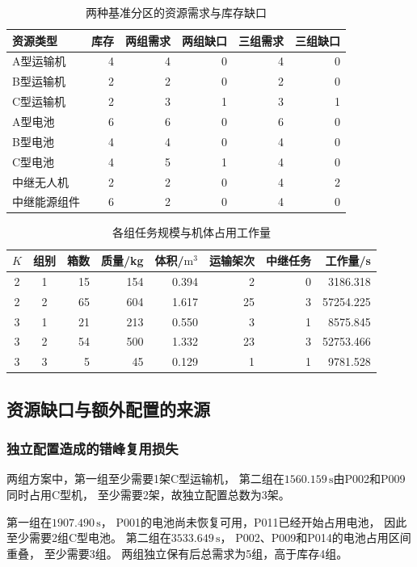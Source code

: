 \documentclass[bwprint]{gmcmthesis}
\begin{document}
\begin{table}[htbp]
\centering
\caption{两种基准分区的资源需求与库存缺口}
\label{tab:q4_resources}
\begin{tabular}{lrrrrr}
\toprule
资源类型 & 库存 & 两组需求 & 两组缺口 & 三组需求 & 三组缺口\\
\midrule
A型运输机 &4&4&0&4&0\\
B型运输机 &2&2&0&2&0\\
C型运输机 &2&3&1&3&1\\
A型电池   &6&6&0&6&0\\
B型电池   &4&4&0&4&0\\
C型电池   &4&5&1&4&0\\
中继无人机 &2&2&0&4&2\\
中继能源组件 &6&2&0&4&0\\
\bottomrule
\end{tabular}
\end{table}

\begin{table}[htbp]
\centering
\caption{各组任务规模与机体占用工作量}
\label{tab:q4_workload}
\small
\begin{tabular}{ccrrrrrr}
\toprule
$K$ & 组别 & 箱数 & 质量/kg & 体积/$\mathrm{m}^3$
& 运输架次 & 中继任务 & 工作量/s\\
\midrule
2&1&15&154&0.394&2&0&3186.318\\
2&2&65&604&1.617&25&3&57254.225\\
\midrule
3&1&21&213&0.550&3&1&8575.845\\
3&2&54&500&1.332&23&3&52753.466\\
3&3&5&45&0.129&1&1&9781.528\\
\bottomrule
\end{tabular}
\end{table}

\subsection{资源缺口与额外配置的来源}

\subsubsection{独立配置造成的错峰复用损失}

两组方案中，第一组至少需要1架C型运输机，
第二组在$1560.159\,\mathrm{s}$由P002和P009同时占用C型机，
至少需要2架，故独立配置总数为3架。

第一组在$1907.490\,\mathrm{s}$，
P001的电池尚未恢复可用，P011已经开始占用电池，
因此至少需要2组C型电池。
第二组在$3533.649\,\mathrm{s}$，
P002、P009和P014的电池占用区间重叠，
至少需要3组。
两组独立保有后总需求为5组，高于库存4组。
\end{document}
